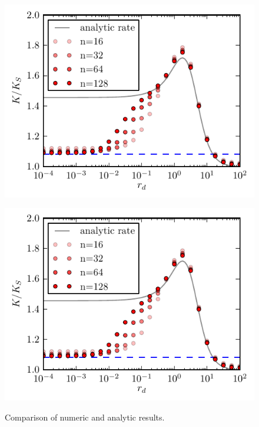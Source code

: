 \begin{minipage}[t]{.5 \textwidth}
    \begin{figure}[H]
        \includegraphics[width = 1 \textwidth]{plots/conv_symmetric.pdf}
    \end{figure}
\end{minipage}\begin{minipage}[t]{.5 \textwidth}
    \begin{figure}[H]
        \includegraphics[width = 1 \textwidth]{plots/conv_symmetric.pdf}
    \end{figure}
\end{minipage}

\begin{minipage}[t]{1 \textwidth}
    \begin{figure}[H]
        \caption{Comparison of numeric and analytic results. }
    \end{figure}
\end{minipage}



